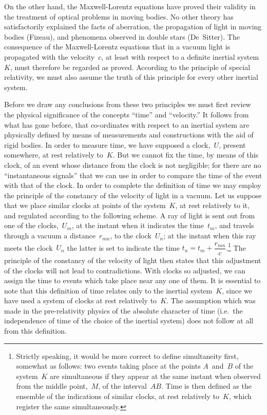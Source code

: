 \documentclass[12pt]{book}[2005/09/16]
\newcommand{\PageSep}[1]{\ignorespaces}
\begin{document}
On the other hand, the Maxwell-Lorentz equations
have proved their validity in the treatment of optical
problems in moving bodies. No other theory has
satisfactorily explained the facts of aberration, the
propagation of light in moving bodies (Fizeau), and
%
phenomena observed in double stars (De~Sitter). The
%
consequence of the Maxwell-Lorentz equations that in a
vacuum light is propagated with the velocity~$c$, at least
with respect to a definite inertial system~$K$, must therefore
be regarded as proved. According to the principle
of special relativity, we must also assume the truth of
this principle for every other inertial system.

Before we draw any conclusions from these two
principles we must first review the physical significance
\PageSep{30}
%
%
of the concepts ``time'' and ``velocity.'' It follows from
what has gone before, that co-ordinates with respect to
an inertial system are physically defined by means of
measurements and constructions with the aid of rigid
bodies. In order to measure time, we have supposed a
clock,~$U$, present somewhere, at rest relatively to~$K$. But
we cannot fix the time, by means of this clock, of an event
whose distance from the clock is not negligible; for there
are no ``instantaneous signals'' that we can use in order
to compare the time of the event with that of the clock.
In order to complete the definition of time we may
employ the principle of the constancy of the velocity of
light in a vacuum. Let us suppose that we place similar
clocks at points of the system~$K$, at rest relatively to it,
and regulated according to the following scheme. A ray
of light is sent out from one of the clocks,~$U_{m}$, at the
instant when it indicates the time~$t_{m}$, and travels through
a vacuum a distance~$r_{mn}$, to the clock~$U_{n}$; at the instant
when this ray meets the clock~$U_{n}$ the latter is set to
indicate the time $t_{n} = t_{m} + \dfrac{r_{mn}}{c}$.\footnote
  {Strictly speaking, it would be more correct to define simultaneity first,
%
  somewhat as follows: two events taking place at the points $A$~and~$B$ of
  the system~$K$ are simultaneous if they appear at the same instant when
  observed from the middle point,~$M$, of the interval~$AB$. Time is then
  defined as the ensemble of the indications of similar clocks, at rest
  relatively to~$K$, which register the same simultaneously.}
The principle of the
constancy of the velocity of light then states that this
adjustment of the clocks will not lead to contradictions.
With clocks so adjusted, we can assign the time to events
which take place near any one of them. It is essential to
\PageSep{31}
note that this definition of time relates only to the inertial
system~$K$, since we have used a system of clocks at rest
relatively to~$K$. The assumption which was made in the
pre-relativity physics of the absolute character of time
(i.e.~the independence of time of the choice of the inertial
system) does not follow at all from this definition.
\end{document}
